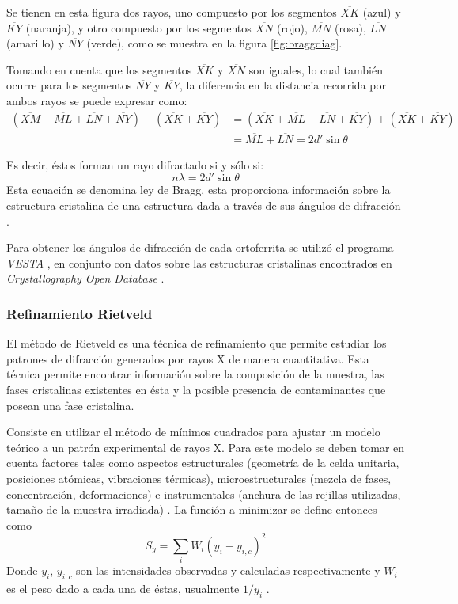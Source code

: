 \documentclass[../main.tex]{subfiles}
\begin{document}
Se tienen en esta figura dos rayos, uno compuesto por los segmentos $\overline{XK}$ (azul) y $\overline{KY}$ (naranja), y otro compuesto por los segmentos $\overline{XN}$ (rojo), $\overline{MN}$ (rosa), $\overline{LN}$ (amarillo) y $\overline{NY}$ (verde), como se muestra en la figura \ref{fig:braggdiag}.

Tomando en cuenta que los segmentos $\overline{XK}$ y $\overline{XN}$ son iguales, lo cual también ocurre para los segmentos $\overline{NY}$ y $\overline{KY}$, la diferencia en la distancia recorrida por ambos rayos se puede expresar como:
\begin{equation}
    \begin{split}
        (\overline{XM}+\overline{ML}+\overline{LN}+\overline{NY})-(\overline{XK}+\overline{KY})&=(\overline{XK}+\overline{ML}+\overline{LN}+\overline{KY})+(\overline{XK}+\overline{KY})\\
        &=\overline{ML}+\overline{LN}=2d'\sin{\theta}
    \end{split}
    \label{eq:rayosbragg}
\end{equation}

Es decir, éstos forman un rayo difractado si y sólo si:
\begin{equation}
    n\lambda=2d'\sin{\theta}
    \label{eq:leydebragg}
\end{equation}
Esta ecuación se denomina ley de Bragg, esta proporciona información sobre la estructura cristalina de una estructura dada a través de sus ángulos de difracción \cite{Cullity2014}.

Para obtener los ángulos de difracción de cada ortoferrita se utilizó el programa \textit{VESTA} \cite{VESTA}, en conjunto con datos sobre las estructuras cristalinas encontrados en \textit{Crystallography Open Database} \cite{COD}.
\subsubsection{Refinamiento Rietveld}
El método de Rietveld es una técnica de refinamiento que permite estudiar los patrones de difracción generados por rayos X de manera cuantitativa. Esta técnica permite encontrar información sobre la composición de la muestra, las fases cristalinas existentes en ésta y la posible presencia de contaminantes que posean una fase cristalina.

Consiste en utilizar el método de mínimos cuadrados para ajustar un modelo teórico a un patrón experimental de rayos X. Para este modelo se deben tomar en cuenta factores tales como aspectos estructurales (geometría de la celda unitaria, posiciones atómicas, vibraciones térmicas), microestructurales (mezcla de fases, concentración, deformaciones) e instrumentales (anchura de las rejillas utilizadas, tamaño de la muestra irradiada) \cite{Rietveld}. La función a minimizar se define entonces como
\begin{equation}
    S_y=\sum_i W_i\left(y_{i}-y_{i,c}\right)^2
    \label{eq:minimcuad}
\end{equation}
Donde $y_{i}$, $y_{i,c}$ son las intensidades observadas y calculadas respectivamente y $W_i$ es el peso dado a cada una de éstas, usualmente $1/y_i$ \cite{Fuentes2004}.
\end{document}
